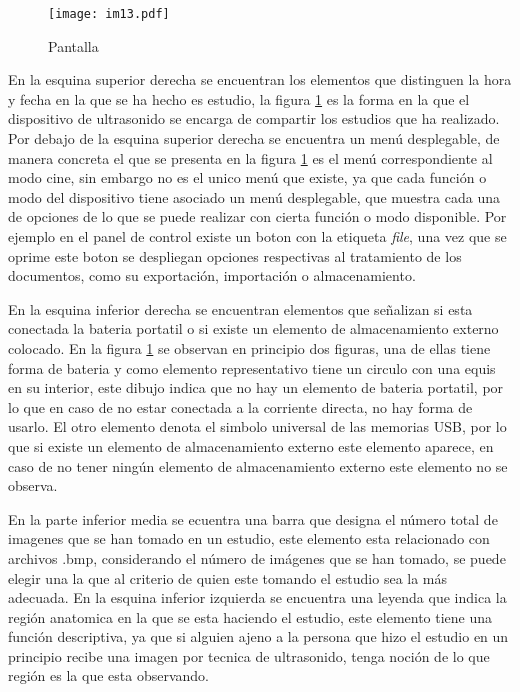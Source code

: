 \documentclass[letterpaper,12pt,oneside]{book}
\begin{document}
\begin{figure}[h!]
    \centering
    \texttt{[image: im13.pdf]}
    \caption{Pantalla}
    \label{fig:pantalla}
\end{figure}



\vspace{10pt}

En la esquina superior derecha se encuentran los elementos que distinguen la hora y fecha en la que se ha hecho es estudio, la figura \ref{fig:pantalla} es la forma en la que el dispositivo de ultrasonido se encarga de compartir los estudios que ha realizado. Por debajo de la esquina superior derecha se encuentra un menú desplegable, de manera concreta el que se presenta en la figura \ref{fig:pantalla} es el menú correspondiente al modo cine, sin embargo no es el unico menú que existe, ya que cada función o modo del dispositivo tiene asociado un menú desplegable, que muestra cada una de opciones de lo que se puede realizar con cierta función o modo disponible. Por ejemplo en el panel de control existe un boton con la etiqueta \textit{file}, una vez que se oprime este boton se despliegan opciones respectivas al tratamiento de los documentos, como su exportación, importación o almacenamiento. 

\vspace{10pt}


En la esquina inferior derecha se encuentran elementos que señalizan si esta conectada la bateria portatil o si existe un elemento de almacenamiento externo colocado. En la figura \ref{fig:pantalla} se observan en principio dos figuras, una de ellas tiene forma de bateria y como elemento representativo tiene un circulo con una equis en su interior, este dibujo indica que no hay un elemento de bateria portatil, por lo que en caso de no estar conectada a la corriente directa, no hay forma de usarlo. El otro elemento denota el simbolo universal de las memorias USB, por lo que si existe un elemento de almacenamiento externo este elemento aparece, en caso de no tener ningún elemento de almacenamiento externo este elemento no se observa.

\vspace{10pt}


En la parte inferior media se ecuentra una barra que designa el número total de imagenes que se han tomado en un estudio, este elemento esta relacionado con archivos .bmp, considerando el número de imágenes que se han tomado, se puede elegir una la que al criterio de quien este tomando el estudio sea la más adecuada. En la esquina inferior izquierda se encuentra una leyenda que indica la región anatomica en la que se esta haciendo el estudio, este elemento tiene una función descriptiva, ya que si alguien ajeno a la persona que hizo el estudio en un principio recibe una imagen por tecnica de ultrasonido, tenga noción de lo que región es la que esta observando. 
\end{document}
